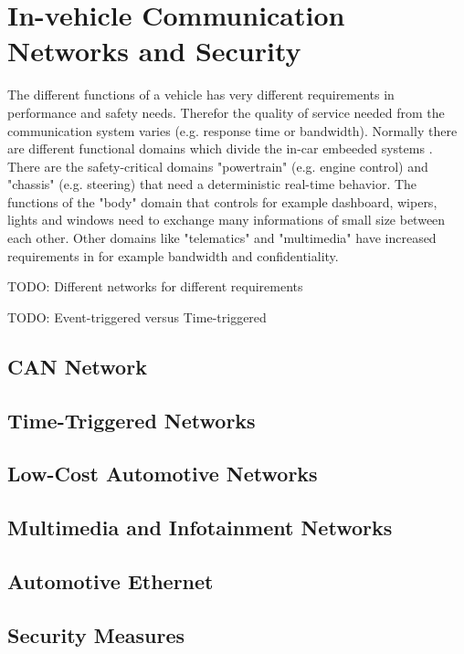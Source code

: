 

\section{In-vehicle Communication Networks and Security}
\label{sec:communication-networks}

The different functions of a vehicle has very different requirements in
performance and safety needs. Therefor the quality of service needed from the
communication system varies (e.g. response time or bandwidth). Normally there
are different functional domains which divide the in-car embeeded systems
\cite{Navet2017}. There are the safety-critical domains "powertrain" (e.g.
engine control) and "chassis" (e.g. steering) that need a deterministic
real-time behavior. The functions of the "body" domain that controls for example
dashboard, wipers, lights and windows need to exchange many informations of
small size between each other. Other domains like "telematics" and "multimedia"
have increased requirements in for example bandwidth and confidentiality.

TODO: Different networks for different requirements

TODO: Event-triggered versus Time-triggered

\subsection{CAN Network}

\subsection{Time-Triggered Networks}

\subsection{Low-Cost Automotive Networks}

\subsection{Multimedia and Infotainment Networks}

\subsection{Automotive Ethernet}

\subsection{Security Measures}

